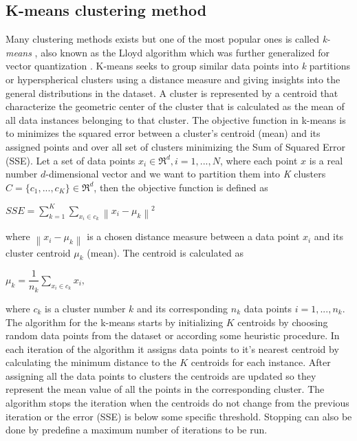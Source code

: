 \subsection{K-means clustering method}
Many clustering methods exists but one of the most popular ones is called \textit{k-means} \citep{FORGYE.W.:1965,MacQueen:1967KMeans}, also known as the Lloyd algorithm \citep{Lloyd:1982} which was further generalized for vector quantization \citep{Linde:1980VQ}. K-means seeks to group similar data points into \textit{k} partitions or hyperspherical clusters using a distance measure and giving insights into the general distributions in the dataset. A cluster is represented by a centroid that characterize the geometric center of the cluster that is calculated as the mean of all data instances belonging to that cluster. The objective function in k-means is to minimizes the squared error between a cluster's centroid (mean) and its assigned points and over all set of clusters minimizing the Sum of Squared Error (SSE). Let a set of data points $x_i \in \Re^d, i=1,...,N$, where each point $x$ is a real number $d$-dimensional vector and we want to partition them into \textit{K} clusters $C=\{c_1,...,c_K\} \in \Re^d$, then the objective function is defined as

\begin{center}
$SSE =\displaystyle \sum_{k=1}^{K}\displaystyle \sum_{x_i \in c_k}\left \| x_i-\mu_k \right \|^2$ 
\end{center}

where $\left \| x_i-\mu_k \right \|$ is a chosen distance measure between a data point $x_i$ and its cluster centroid $\mu_k$ (mean). The centroid is calculated as 

\begin{center}
$\mu_k = \dfrac{1}{n_k}\displaystyle \sum_{x_i \in c_k}x_i,$ 
\end{center}

where $c_k$ is a cluster number $k$ and its corresponding $n_k$ data points $i=1,...,n_k$. The algorithm for the k-means starts by initializing $K$ centroids by choosing random data points from the dataset or according some heuristic procedure. In each iteration of the algorithm it assigns data points to it's nearest centroid by calculating the minimum distance to the $K$ centroids for each instance. After assigning all the data points to clusters the centroids are updated so they represent the mean value of all the points in the corresponding cluster. The algorithm stops the iteration when the centroids do not change from the previous iteration or the error (SSE) is below some specific threshold. Stopping can also be done by predefine a maximum number of iterations to be run. 


